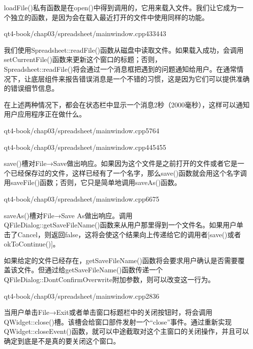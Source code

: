 \documentclass[11pt,oneside]{book}
\begin{document}
\begin{common-format}
loadFile()私有函数是在open()中得到调用的，它用来载入文件。我们让它成为一个独立的函数，是因为会在载入最近打开的文件中使用同样的功能。

\begin{cppline}{qt4-book/chap03/spreadsheet/mainwindow.cpp}{433}{443}
\end{cppline}

我们使用Spreadsheet::readFile()函数从磁盘中读取文件。如果载入成功，会调用setCurrentFile()函数来更新这个窗口的标题；否则，\\ Spreadsheet::readFile()将会通过一个消息框把遇到的问题通知给用户。在通常情况下，让底层组件来报告错误消息是一个不错的习惯，这是因为它们可以提供准确的错误细节信息。

在上述两种情况下，都会在状态栏中显示一个消息2秒（2000毫秒），这样可以通知用户应用程序正在做什么。

\begin{cppline}{qt4-book/chap03/spreadsheet/mainwindow.cpp}{57}{64}
\end{cppline}

\begin{cppline}{qt4-book/chap03/spreadsheet/mainwindow.cpp}{445}{455}
\end{cppline}

save()槽对File→Save做出响应。如果因为这个文件是之前打开的文件或者它是一个已经保存过的文件，这样已经有了一个名字，那么save()函数就会用这个名字调用saveFile()函数；否则，它只是简单地调用saveAs()函数。

\begin{cppline}{qt4-book/chap03/spreadsheet/mainwindow.cpp}{66}{75}
\end{cppline}

saveAs()槽对File→Save As做出响应。调用\\ QFileDialog::getSaveFileName()函数来从用户那里得到一个文件名。如果用户单击了Cancel，则返回false，这将会使这个结果向上传递给它的调用者[save()或者okToContinue()]。

如果给定的文件已经存在，getSaveFileName()函数将会要求用户确认是否需要覆盖该文件。但通过给getSaveFileName()函数传递一个QFileDialog::DontConfirmOverwrite附加参数，则可以改变这一行为。

\begin{cppline}{qt4-book/chap03/spreadsheet/mainwindow.cpp}{28}{36}
\end{cppline}

当用户单击File→Exit或者单击窗口标题栏中的关闭按钮时，将会调用QWidget::close()槽。该槽会给窗口部件发射一个“close”事件。通过重新实现QWidget::closeEvent()函数，就可以中途截取对这个主窗口的关闭操作，并且可以确定到底是不是真的要关闭这个窗口。


\end{common-format}
\end{document}
